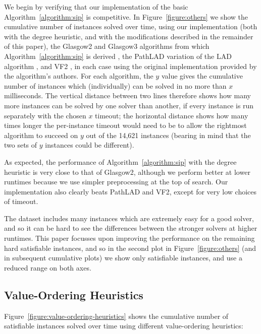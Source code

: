 \documentclass[a4paper,UKenglish]{lipics-v2018}
\newcommand{\figureref}[1]{Figure~\ref{#1}}
\newcommand{\Figureref}[1]{Figure~\ref{#1}}
\newcommand{\algorithmref}[1]{Algorithm~\ref{#1}}
\begin{document}
We begin by verifying that our implementation of the basic \algorithmref{algorithm:sip} is competitive. In
\figureref{figure:others} we show the cumulative number of instances solved over time, using our
implementation (both with the degree heuristic, and with the modifications described in the
remainder of this paper), the Glasgow2 and Glasgow3 algorithms from which \algorithmref{algorithm:sip} is derived
\cite{DBLP:conf/cp/McCreeshP15,DBLP:conf/lion/KotthoffMS16}, the PathLAD variation of the LAD
algorithm \cite{DBLP:journals/ai/Solnon10,DBLP:conf/lion/KotthoffMS16}, and VF2
\cite{DBLP:journals/pami/CordellaFSV04}, in each case using the original implementation provided
by the algorithm's authors. For each algorithm, the $y$ value
gives the cumulative number of instances which (individually) can be solved in no more than $x$
milliseconds.  The vertical distance between two lines therefore shows how many more instances can
be solved by one solver than another, if every instance is run separately with the chosen $x$
timeout; the horizontal distance shows how many times longer the per-instance timeout would need to
be to allow the rightmost algorithm to succeed on $y$ out of the 14,621 instances (bearing in mind
that the two sets of $y$ instances could be different).

As expected, the performance of \algorithmref{algorithm:sip} with the degree heuristic is very close to that
of Glasgow2, although we perform better at lower runtimes because we use simpler preprocessing at
the top of search. Our implementation also clearly beats PathLAD and VF2, except for very low
choices of timeout.

The dataset includes many instances which are extremely easy for a good solver, and so it can be
hard to see the differences between the stronger solvers at higher runtimes. This paper focusses
upon improving the performance on the remaining hard satisfiable instances, and so in the second
plot in \figureref{figure:others} (and in subsequent cumulative plots) we show only satisfiable
instances, and use a reduced range on both axes.

\subsection{Value-Ordering Heuristics}

\Figureref{figure:value-ordering-heuristics} shows the cumulative number of satisfiable instances
solved over time using different value-ordering heuristics:
\end{document}

